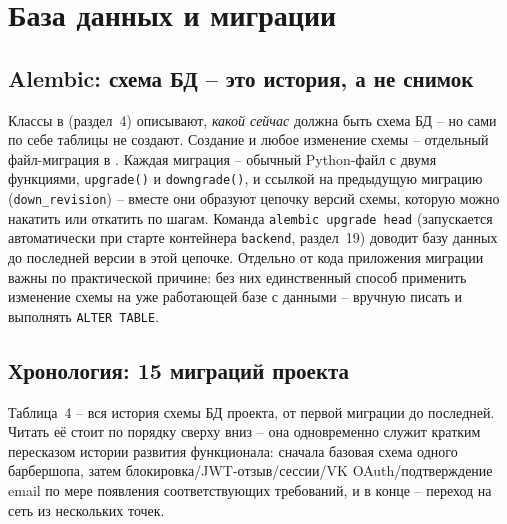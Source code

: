 \section{База данных и миграции}

\subsection{Alembic: схема БД -- это история, а не снимок}

Классы в  (раздел~4) описывают, \emph{какой
сейчас} должна быть схема БД -- но сами по себе таблицы не создают.
Создание и любое изменение схемы -- отдельный файл-миграция в
. Каждая миграция -- обычный Python-файл
с двумя функциями, \texttt{upgrade()} и \texttt{downgrade()}, и ссылкой на
предыдущую миграцию (\texttt{down_revision}) -- вместе они образуют
цепочку версий схемы, которую можно накатить или откатить по шагам.
Команда \texttt{alembic upgrade head} (запускается автоматически при
старте контейнера \texttt{backend}, раздел~19) доводит базу данных до
последней версии в этой цепочке. Отдельно от кода приложения миграции
важны по практической причине: без них единственный способ применить
изменение схемы на уже работающей базе с данными -- вручную писать и
выполнять \texttt{ALTER TABLE}.

\subsection{Хронология: 15 миграций проекта}

Таблица~4 -- вся история схемы БД проекта, от первой миграции до
последней. Читать её стоит по порядку сверху вниз -- она одновременно
служит кратким пересказом истории развития функционала: сначала базовая
схема одного барбершопа, затем блокировка/JWT-отзыв/сессии/VK
OAuth/подтверждение email по мере появления соответствующих требований, и
в конце -- переход на сеть из нескольких точек.

